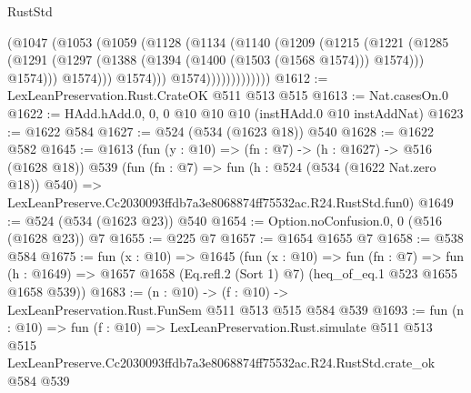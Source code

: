 \begin{lexlean}{RustStd}
\begin{coremodule}
                          (@1047
                            (@1053
                              (@1059
                                (@1128
                                  (@1134
                                    (@1140
                                      (@1209
                                        (@1215
                                          (@1221
                                            (@1285
                                              (@1291
                                                (@1297
                                                  (@1388
                                                    (@1394 (@1400 (@1503 (@1568 @1574))) @1574)))
                                                @1574)))
                                          @1574)))
                                    @1574)))
                              @1574)))))))))))))
@1612 := LexLeanPreservation.Rust.CrateOK @511 @513 @515
@1613 := Nat.casesOn.{0}
@1622 := HAdd.hAdd.{0, 0, 0} @10 @10 @10 (instHAdd.{0} @10 instAddNat)
@1623 := @1622 @584
@1627 := @524 (@534 (@1623 @18)) @540
@1628 := @1622 @582
@1645 := @1613
    (fun (y : @10) => (fn : @7) -> (h : @1627) -> @516 (@1628 @18))
    @539
    (fun (fn : @7) =>
    fun (h : @524 (@534 (@1622 Nat.zero @18)) @540) =>
    LexLeanPreserve.Cc2030093ffdb7a3e8068874ff75532ac.R24.RustStd.fun0)
@1649 := @524 (@534 (@1623 @23)) @540
@1654 := Option.noConfusion.{0, 0} (@516 (@1628 @23)) @7
@1655 := @225 @7
@1657 := @1654 @1655 @7
@1658 := @538 @584
@1675 := fun (x : @10) =>
  @1645
    (fun (x : @10) =>
    fun (fn : @7) =>
    fun (h : @1649) => @1657 @1658 (Eq.refl.{2} (Sort 1) @7) (heq_of_eq.{1} @523 @1655 @1658 @539))
@1683 := (n : @10) -> (f : @10) -> LexLeanPreservation.Rust.FunSem @511 @513 @515 @584 @539
@1693 := fun (n : @10) =>
  fun (f : @10) =>
  LexLeanPreservation.Rust.simulate
    @511
    @513
    @515
    LexLeanPreserve.Cc2030093ffdb7a3e8068874ff75532ac.R24.RustStd.crate_ok
    @584
    @539
\end{coremodule}
\end{lexlean}
